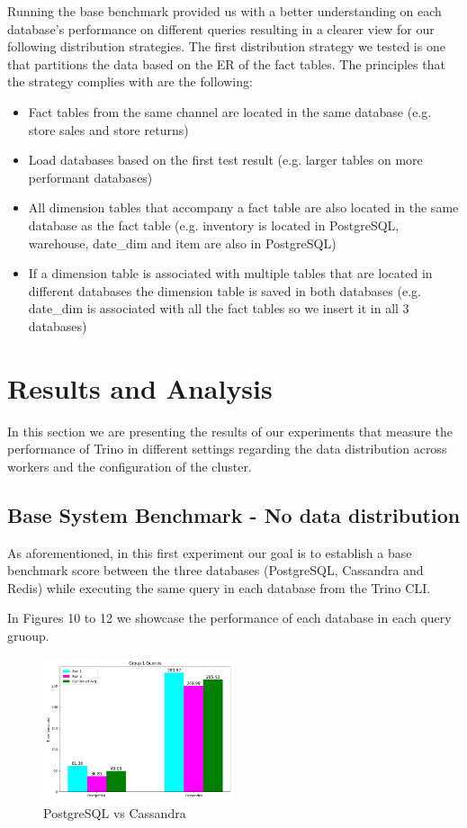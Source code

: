 \documentclass[conference]{IEEEtran}
\begin{document}
Running the base benchmark provided us with a better understanding on each database's performance on different queries resulting in a clearer view for our following distribution strategies. The first distribution strategy we tested is one that partitions the data based on the ER of the fact tables.
The principles that the strategy complies with are the following:
\begin{itemize}
    \item \textbf{} Fact tables from the same channel are located in the same database (e.g. store sales and store returns)
    \item \textbf{} Load databases based on the first test result (e.g. larger tables on more performant databases)
    \item \textbf{} All dimension tables that accompany a fact table are also located in the same database as the fact table (e.g. inventory is located in PostgreSQL, warehouse, date\_dim and item are also in PostgreSQL)
    \item \textbf{} If a dimension table is associated with multiple tables that are located in different databases the dimension table is saved in both databases (e.g. date\_dim is associated with all the fact tables so we insert it in all 3 databases)
\end{itemize}

\section{Results and Analysis}

In this section we are presenting the results of our experiments that measure the performance of Trino in different settings regarding the data distribution across workers and the configuration of the cluster.

\subsection{Base System Benchmark - No data distribution}
\label{sec:no-data-distribution}

As aforementioned, in this first experiment our goal is to establish a base benchmark score between the three databases (PostgreSQL, Cassandra and Redis) while executing the same query in each database from the Trino CLI.

In Figures 10 to 12 we showcase the performance of each database in each query gruoup.

\begin{figure}[h]
    \centering
    \includegraphics[width=0.5\textwidth]{images/DBs_bench_no_distro/group1.png}
    \caption{PostgreSQL vs Cassandra}
    \label{fig:psql-cass-group1}
\end{figure}
\end{document}
